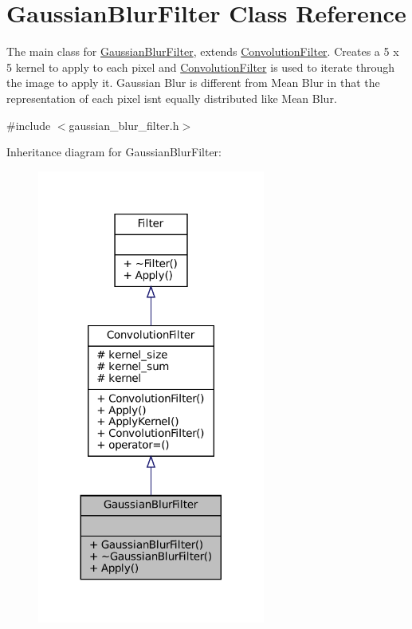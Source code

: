\hypertarget{classGaussianBlurFilter}{}\section{Gaussian\+Blur\+Filter Class Reference}
\label{classGaussianBlurFilter}


The main class for \hyperlink{classGaussianBlurFilter}{Gaussian\+Blur\+Filter}, extends \hyperlink{classConvolutionFilter}{Convolution\+Filter}. Creates a 5 x 5 kernel to apply to each pixel and \hyperlink{classConvolutionFilter}{Convolution\+Filter} is used to iterate through the image to apply it. Gaussian Blur is different from Mean Blur in that the representation of each pixel isn\textquotesingle{}t equally distributed like Mean Blur.  




{\ttfamily \#include $<$gaussian\+\_\+blur\+\_\+filter.\+h$>$}



Inheritance diagram for Gaussian\+Blur\+Filter\+:\nopagebreak
\begin{figure}[H]
\begin{center}
\leavevmode
\includegraphics[width=212pt]{classGaussianBlurFilter__inherit__graph}
\end{center}
\end{figure}


